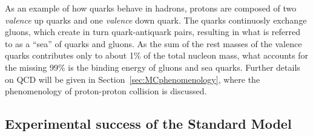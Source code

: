 As an example of how quarks behave in hadrons,
protons are composed of two {\it valence} up quarks
and one {\it valence} down quark. The quarks continuosly
exchange gluons, which create in turn quark-antiquark pairs,
resulting in what is referred to as a ``sea'' 
of quarks and gluons. 
As the sum of the rest masses of the valence quarks contributes 
only to about 1\% of the total nucleon
mass, what accounts for the missing 99\% is the
binding energy of gluons and sea quarks.
Further details on QCD will be given in Section~\ref{sec:MCphenomenology},
where the phenomenology of proton-proton collision
is discussed.



\subsection{Experimental success of the Standard Model}\label{sec:THsuccess}

